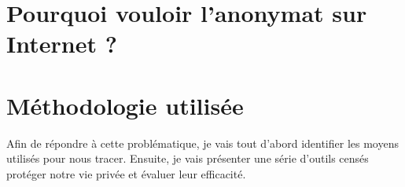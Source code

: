 
\section{Pourquoi vouloir l'anonymat sur Internet ?}

\section{Méthodologie utilisée}
Afin de répondre à cette problématique, je vais tout d'abord identifier les moyens utilisés pour nous tracer. Ensuite, je vais présenter une série d'outils censés protéger notre vie privée et évaluer leur efficacité.
